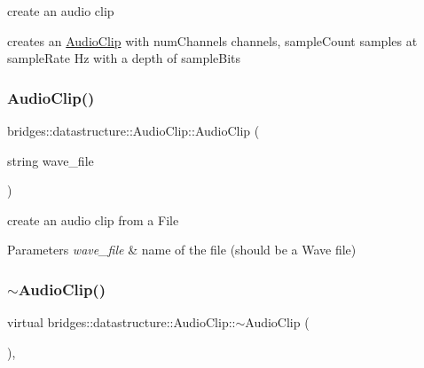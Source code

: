 create an audio clip 

creates an \hyperlink{classbridges_1_1datastructure_1_1_audio_clip}{Audio\+Clip} with num\+Channels channels, sample\+Count samples at sample\+Rate Hz with a depth of sample\+Bits \mbox{\label{classbridges_1_1datastructure_1_1_audio_clip_a511ebded2a4d762432d0ebc953791f58}} 
\subsubsection{\texorpdfstring{Audio\+Clip()}{AudioClip()}\hspace{0.1cm}{\footnotesize\ttfamily [2/2]}}
{\footnotesize\ttfamily bridges\+::datastructure\+::\+Audio\+Clip\+::\+Audio\+Clip (\begin{DoxyParamCaption}\item[{string}]{wave\+\_\+file }\end{DoxyParamCaption})\hspace{0.3cm}{\ttfamily [inline]}}



create an audio clip from a File 


\begin{DoxyParams}{Parameters}
{\em wave\+\_\+file} & name of the file (should be a Wave file) \\
\hline
\end{DoxyParams}
\mbox{\label{classbridges_1_1datastructure_1_1_audio_clip_add941e825645807841afd9653fef4803}} 
\subsubsection{\texorpdfstring{$\sim$\+Audio\+Clip()}{~AudioClip()}}
{\footnotesize\ttfamily virtual bridges\+::datastructure\+::\+Audio\+Clip\+::$\sim$\+Audio\+Clip (\begin{DoxyParamCaption}{ }\end{DoxyParamCaption})\hspace{0.3cm}{\ttfamily [inline]}, {\ttfamily [virtual]}}



